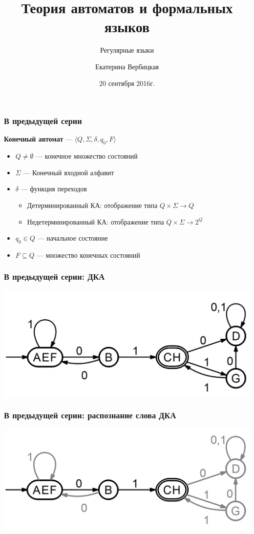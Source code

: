 \documentclass{beamer}
\title[]{Теория автоматов и формальных языков}
\subtitle[]{Регулярные языки}
\institute[]{
Санкт-Петербургский государственный электротехнический университет <<ЛЭТИ>>\\
}
\author[]{Екатерина Вербицкая}
\date{20 сентября 2016г.}
\begin{document}
{
  \begin{frame}
    \titlepage
  \end{frame}
}


\begin{frame}[fragile]
  \transwipe[direction=90]
  \frametitle{В предыдущей серии}
  \textbf{Конечный автомат} --- $\langle Q, \Sigma, \delta, q_0, F \rangle$
  \begin{itemize}
    \item $Q \neq \emptyset$ --- конечное множество состояний
    \item $\Sigma$ --- Конечный входной алфавит
    \item $\delta$ --- функция переходов
    \begin{itemize}
      \item Детерминированный КА: отображение типа $Q \times \Sigma \rightarrow Q$
      \item Недетерминированный КА: отображение типа $Q \times \Sigma \rightarrow 2^Q$
    \end{itemize}
    \item $q_0 \in Q$ --- начальное состояние
    \item $F \subseteq Q$ --- множество конечных состояний
  \end{itemize}
\end{frame}

\begin{frame}[fragile]
  \transwipe[direction=90]
  \frametitle{В предыдущей серии: ДКА}
  \begin{center}
  \includegraphics[width=\textwidth]{pics/det.png}  
  \end{center}
\end{frame}

\begin{frame}[fragile]
  \transwipe[direction=90]
  \frametitle{В предыдущей серии: распознание слова ДКА}
  \begin{center}
  \includegraphics[width=\textwidth]{pics/path1.png}  
  \end{center}
\end{frame}
\end{document}
